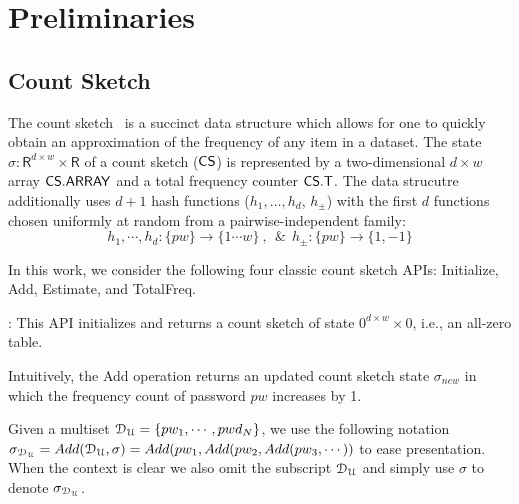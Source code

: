 



\vspace*{-\baselineskip}
\section{Preliminaries} \label{section:Prelinmaries}

\vspace*{-\baselineskip}

\subsection{Count Sketch}\label{section:Prelinmaries-CountSketch} %
\vspace*{-\baselineskip}
The count sketch~\cite{ICALP:ChaCheFar02} is a succinct data structure which allows for one to quickly obtain an approximation of the frequency of any item in a dataset.   The state $\sigma: \mathsf{R}^{d\times w} \times \mathsf{R}$ of a count sketch ($\mathsf{CS}$) is represented by a two-dimensional $d\times w$ array $\mathsf{CS.ARRAY}$ and a total frequency counter $\mathsf{CS.T}$. The data strucutre additionally uses $d+1$ hash functions ($h_1, \ldots, h_d$, $h_{\pm}$) with the first $d$ functions chosen uniformly at random from a pairwise-independent family:  
		$$h_1, \cdots, h_d : \{pw\} \rightarrow \{1\cdots w\}~ ,~~ \&~~ h_{\pm} : \{pw\} \rightarrow \{1, -1\}$$
	
In this work, we consider the following four classic count sketch APIs: Initialize, Add, Estimate, and TotalFreq. 


: This API initializes and returns a count sketch of state $0^{d\times w}\times 0$, i.e., an all-zero table.


 Intuitively, the Add operation returns an updated count sketch state $\sigma_{new}$ in which the frequency count of password $pw$ increases by 1.

Given a multiset $\mathcal{D}_{{\mathcal{U}}} = \{pw_1,\cdots,pwd_N\}$, we use the following notation $\sigma_{\mathcal{D}_{{\mathcal{U}}}} =  Add(\mathcal{D}_{{\mathcal{U}}},\sigma) \\= Add(pw_1, Add(pw_2,Add(pw_3,\cdots))$ to ease presentation. When the context is clear we also omit the subscript $\mathcal{D}_{{\mathcal{U}}}$ and simply use $\sigma$ to denote $\sigma_{\mathcal{D}_{{\mathcal{U}}}}$.


